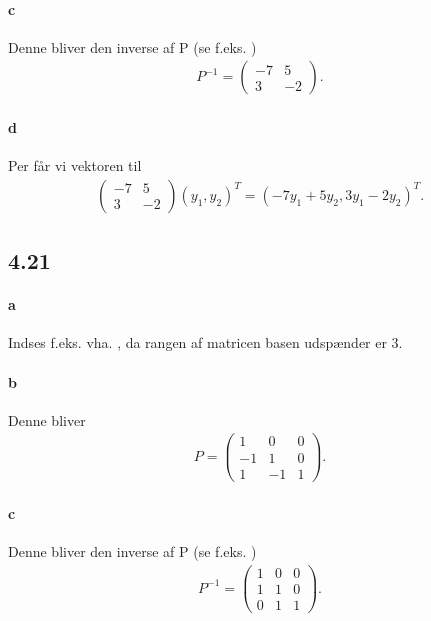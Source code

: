 			\paragraph{c} Denne bliver den inverse af P (se f.eks. \cite[Eks. 4.4.13]{hesselholt2017})
				\begin{align*}
					P^{-1}=\left(\begin{array}{rr} {-7} & {5} \\ {3} & {-2} \end{array}\right).
				\end{align*}

			\paragraph{d} Per \cite[Eks. 4.4.18]{hesselholt2017} får vi vektoren til 
				\begin{align*}
					\left(\begin{array}{rr} {-7} & {5} \\ {3} & {-2} \end{array}\right) (y_1,y_2)^T=(-7y_1+5y_2,3y_1-2y_2)^T.
				\end{align*}

		\subsection{4.21}

			\paragraph{a} Indses f.eks. vha. \cite[Korollar 4.3.12]{hesselholt2017}, da rangen af matricen basen udspænder er $3$.

			\paragraph{b} Denne bliver 
				\begin{align*}
					P=\left(\begin{array}{rrr} {1} & {0} & {0} \\ {-1} & {1} & {0} \\ {1} & {-1} & {1} \end{array}\right).
				\end{align*}

			\paragraph{c} Denne bliver den inverse af P (se f.eks. \cite[Eks. 4.4.13]{hesselholt2017})
				\begin{align*}
					P^{-1}=\left(\begin{array}{rrr} {1} & {0} & {0} \\ {1} & {1} & {0} \\ {0} & {1} & {1} \end{array}\right).
				\end{align*}

